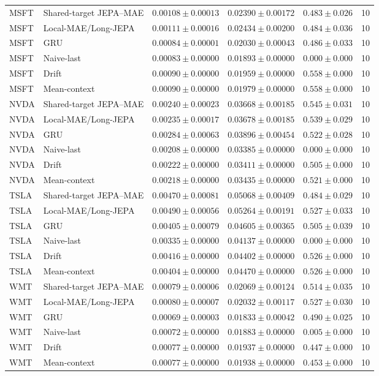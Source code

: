 \begin{longtable}{llrrrr}
MSFT & Shared-target JEPA--MAE & $0.00108 \pm 0.00013$ & $0.02390 \pm 0.00172$ & $0.483 \pm 0.026$ & 10 \\
MSFT & Local-MAE/Long-JEPA & $0.00111 \pm 0.00016$ & $0.02434 \pm 0.00200$ & $0.484 \pm 0.036$ & 10 \\
MSFT & GRU & $0.00084 \pm 0.00001$ & $0.02030 \pm 0.00043$ & $0.486 \pm 0.033$ & 10 \\
MSFT & Naive-last & $0.00083 \pm 0.00000$ & $0.01893 \pm 0.00000$ & $0.000 \pm 0.000$ & 10 \\
MSFT & Drift & $0.00090 \pm 0.00000$ & $0.01959 \pm 0.00000$ & $0.558 \pm 0.000$ & 10 \\
MSFT & Mean-context & $0.00090 \pm 0.00000$ & $0.01979 \pm 0.00000$ & $0.558 \pm 0.000$ & 10 \\
NVDA & Shared-target JEPA--MAE & $0.00240 \pm 0.00023$ & $0.03668 \pm 0.00185$ & $0.545 \pm 0.031$ & 10 \\
NVDA & Local-MAE/Long-JEPA & $0.00235 \pm 0.00017$ & $0.03678 \pm 0.00185$ & $0.539 \pm 0.029$ & 10 \\
NVDA & GRU & $0.00284 \pm 0.00063$ & $0.03896 \pm 0.00454$ & $0.522 \pm 0.028$ & 10 \\
NVDA & Naive-last & $0.00208 \pm 0.00000$ & $0.03385 \pm 0.00000$ & $0.000 \pm 0.000$ & 10 \\
NVDA & Drift & $0.00222 \pm 0.00000$ & $0.03411 \pm 0.00000$ & $0.505 \pm 0.000$ & 10 \\
NVDA & Mean-context & $0.00218 \pm 0.00000$ & $0.03435 \pm 0.00000$ & $0.521 \pm 0.000$ & 10 \\
TSLA & Shared-target JEPA--MAE & $0.00470 \pm 0.00081$ & $0.05068 \pm 0.00409$ & $0.484 \pm 0.029$ & 10 \\
TSLA & Local-MAE/Long-JEPA & $0.00490 \pm 0.00056$ & $0.05264 \pm 0.00191$ & $0.527 \pm 0.033$ & 10 \\
TSLA & GRU & $0.00405 \pm 0.00079$ & $0.04605 \pm 0.00365$ & $0.505 \pm 0.039$ & 10 \\
TSLA & Naive-last & $0.00335 \pm 0.00000$ & $0.04137 \pm 0.00000$ & $0.000 \pm 0.000$ & 10 \\
TSLA & Drift & $0.00416 \pm 0.00000$ & $0.04402 \pm 0.00000$ & $0.526 \pm 0.000$ & 10 \\
TSLA & Mean-context & $0.00404 \pm 0.00000$ & $0.04470 \pm 0.00000$ & $0.526 \pm 0.000$ & 10 \\
WMT & Shared-target JEPA--MAE & $0.00079 \pm 0.00006$ & $0.02069 \pm 0.00124$ & $0.514 \pm 0.035$ & 10 \\
WMT & Local-MAE/Long-JEPA & $0.00080 \pm 0.00007$ & $0.02032 \pm 0.00117$ & $0.527 \pm 0.030$ & 10 \\
WMT & GRU & $0.00069 \pm 0.00003$ & $0.01833 \pm 0.00042$ & $0.490 \pm 0.025$ & 10 \\
WMT & Naive-last & $0.00072 \pm 0.00000$ & $0.01883 \pm 0.00000$ & $0.005 \pm 0.000$ & 10 \\
WMT & Drift & $0.00077 \pm 0.00000$ & $0.01937 \pm 0.00000$ & $0.447 \pm 0.000$ & 10 \\
WMT & Mean-context & $0.00077 \pm 0.00000$ & $0.01938 \pm 0.00000$ & $0.453 \pm 0.000$ & 10 \\
\bottomrule
\end{longtable}

